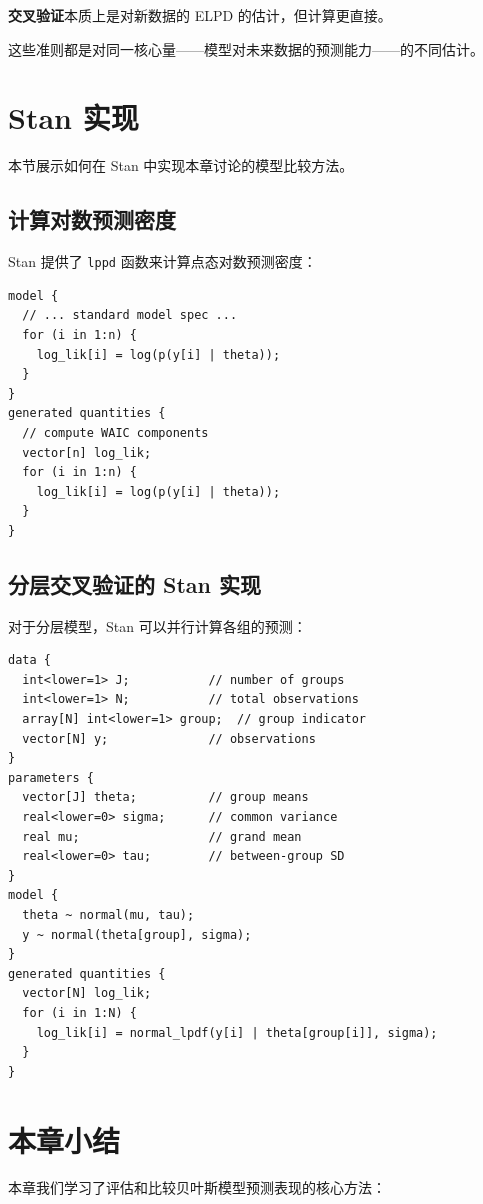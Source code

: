 \textbf{交叉验证}本质上是对新数据的 ELPD 的估计，但计算更直接。

这些准则都是对同一核心量——模型对未来数据的预测能力——的不同估计。

\section{Stan 实现}

本节展示如何在 Stan 中实现本章讨论的模型比较方法。

\subsection{计算对数预测密度}

Stan 提供了 \texttt{lppd} 函数来计算点态对数预测密度：

\begin{verbatim}
model {
  // ... standard model spec ...
  for (i in 1:n) {
    log_lik[i] = log(p(y[i] | theta));
  }
}
generated quantities {
  // compute WAIC components
  vector[n] log_lik;
  for (i in 1:n) {
    log_lik[i] = log(p(y[i] | theta));
  }
}
\end{verbatim}

\subsection{分层交叉验证的 Stan 实现}

对于分层模型，Stan 可以并行计算各组的预测：

\begin{verbatim}
data {
  int<lower=1> J;           // number of groups
  int<lower=1> N;           // total observations
  array[N] int<lower=1> group;  // group indicator
  vector[N] y;              // observations
}
parameters {
  vector[J] theta;          // group means
  real<lower=0> sigma;      // common variance
  real mu;                  // grand mean
  real<lower=0> tau;        // between-group SD
}
model {
  theta ~ normal(mu, tau);
  y ~ normal(theta[group], sigma);
}
generated quantities {
  vector[N] log_lik;
  for (i in 1:N) {
    log_lik[i] = normal_lpdf(y[i] | theta[group[i]], sigma);
  }
}
\end{verbatim}

\section{本章小结}

本章我们学习了评估和比较贝叶斯模型预测表现的核心方法：

